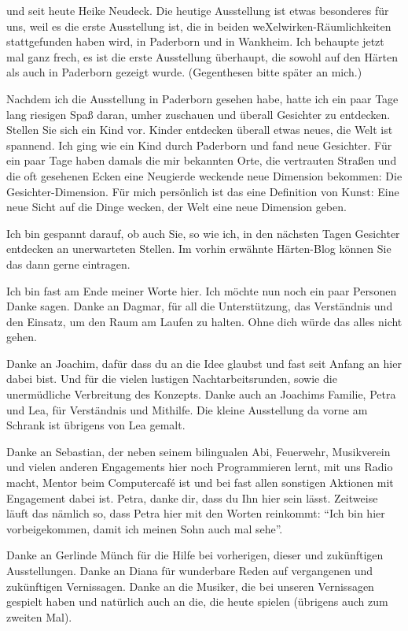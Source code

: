 \begin{appendix}
und seit heute Heike Neudeck. Die heutige Ausstellung ist etwas besonderes für uns, weil es die erste Ausstellung ist, die in beiden weXelwirken-Räumlichkeiten stattgefunden haben wird, in Paderborn und in Wankheim. Ich behaupte jetzt mal ganz frech, es ist die erste Ausstellung überhaupt, die sowohl auf den Härten als auch in Paderborn gezeigt wurde. (Gegenthesen bitte später an mich.)

Nachdem ich die Ausstellung in Paderborn gesehen habe, hatte ich ein paar Tage lang riesigen Spaß daran, umher zuschauen und überall Gesichter zu entdecken. Stellen Sie sich ein Kind vor. Kinder entdecken überall etwas neues, die Welt ist spannend. Ich ging wie ein Kind durch Paderborn und fand neue Gesichter. Für ein paar Tage haben damals die mir bekannten Orte, die vertrauten Straßen und die oft gesehenen Ecken eine Neugierde weckende neue Dimension bekommen: Die Gesichter-Dimension. Für mich persönlich ist das eine Definition von Kunst: Eine neue Sicht auf die Dinge wecken, der Welt eine neue Dimension geben.

Ich bin gespannt darauf, ob auch Sie, so wie ich, in den nächsten Tagen Gesichter entdecken an unerwarteten Stellen. Im vorhin erwähnte Härten-Blog können Sie das dann gerne eintragen.

Ich bin fast am Ende meiner Worte hier. Ich möchte nun noch ein paar Personen Danke sagen.
Danke an Dagmar, für all die Unterstützung, das Verständnis und den Einsatz, um den Raum am Laufen zu halten. Ohne dich würde das alles nicht gehen.

Danke an Joachim, dafür dass du an die Idee glaubst und fast seit Anfang an hier dabei bist. Und für die vielen lustigen Nachtarbeitsrunden, sowie die unermüdliche Verbreitung des Konzepts. Danke auch an Joachims Familie, Petra und Lea, für Verständnis und Mithilfe. Die kleine Ausstellung da vorne am Schrank ist übrigens von Lea gemalt.

Danke an Sebastian, der neben seinem bilingualen Abi, Feuerwehr, Musikverein und vielen anderen Engagements hier noch Programmieren lernt, mit uns Radio macht, Mentor beim Computercafé ist und bei fast allen sonstigen Aktionen mit Engagement dabei ist. Petra, danke dir, dass du Ihn hier sein lässt.
Zeitweise läuft das nämlich so, dass Petra hier mit den Worten reinkommt: "`Ich bin hier vorbeigekommen, damit ich meinen Sohn auch mal sehe"'.

Danke an Gerlinde Münch für die Hilfe bei vorherigen, dieser und zukünftigen Ausstellungen. Danke an Diana für wunderbare Reden auf vergangenen und zukünftigen Vernissagen.
Danke an die Musiker, die bei unseren Vernissagen gespielt haben und natürlich auch an die, die heute spielen (übrigens auch zum zweiten Mal).


\end{appendix}
